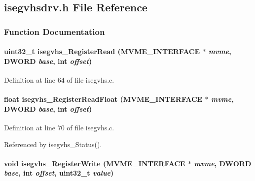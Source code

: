 \subsection{isegvhsdrv.h File Reference}
\label{isegvhsdrv_8h}


\subsubsection{Function Documentation}
\paragraph[{isegvhs\_\-RegisterRead}]{\setlength{\rightskip}{0pt plus 5cm}uint32\_\-t isegvhs\_\-RegisterRead ({\bf MVME\_\-INTERFACE} $\ast$ {\em mvme}, \/  {\bf DWORD} {\em base}, \/  int {\em offset})}\hfill\label{isegvhsdrv_8h_ad44865249ca0620bf6adfe47188c63a0}


Definition at line 64 of file isegvhs.c.
\paragraph[{isegvhs\_\-RegisterReadFloat}]{\setlength{\rightskip}{0pt plus 5cm}float isegvhs\_\-RegisterReadFloat ({\bf MVME\_\-INTERFACE} $\ast$ {\em mvme}, \/  {\bf DWORD} {\em base}, \/  int {\em offset})}\hfill\label{isegvhsdrv_8h_a8993cc4b365d63d6673c6dec9c889dc1}


Definition at line 70 of file isegvhs.c.

Referenced by isegvhs\_\-Status().
\paragraph[{isegvhs\_\-RegisterWrite}]{\setlength{\rightskip}{0pt plus 5cm}void isegvhs\_\-RegisterWrite ({\bf MVME\_\-INTERFACE} $\ast$ {\em mvme}, \/  {\bf DWORD} {\em base}, \/  int {\em offset}, \/  uint32\_\-t {\em value})}\hfill\label{isegvhsdrv_8h_a37cc2259f03b5c7357a688afae618f24}



